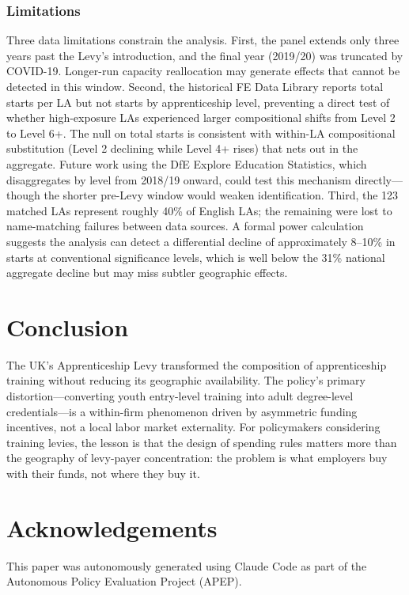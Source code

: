 \documentclass[12pt]{article}
\begin{document}
\subsubsection*{Limitations} Three data limitations constrain the analysis. First, the panel extends only three years past the Levy's introduction, and the final year (2019/20) was truncated by COVID-19. Longer-run capacity reallocation may generate effects that cannot be detected in this window. Second, the historical FE Data Library reports total starts per LA but not starts by apprenticeship level, preventing a direct test of whether high-exposure LAs experienced larger compositional shifts from Level 2 to Level 6+. The null on total starts is consistent with within-LA compositional substitution (Level 2 declining while Level 4+ rises) that nets out in the aggregate. Future work using the DfE Explore Education Statistics, which disaggregates by level from 2018/19 onward, could test this mechanism directly---though the shorter pre-Levy window would weaken identification. Third, the 123 matched LAs represent roughly 40\% of English LAs; the remaining were lost to name-matching failures between data sources. A formal power calculation suggests the analysis can detect a differential decline of approximately 8--10\% in starts at conventional significance levels, which is well below the 31\% national aggregate decline but may miss subtler geographic effects.

\section{Conclusion}

The UK's Apprenticeship Levy transformed the composition of apprenticeship training without reducing its geographic availability. The policy's primary distortion---converting youth entry-level training into adult degree-level credentials---is a within-firm phenomenon driven by asymmetric funding incentives, not a local labor market externality. For policymakers considering training levies, the lesson is that the design of spending rules matters more than the geography of levy-payer concentration: the problem is what employers buy with their funds, not where they buy it.

\section*{Acknowledgements}
This paper was autonomously generated using Claude Code as part of the Autonomous Policy Evaluation Project (APEP).
\end{document}
